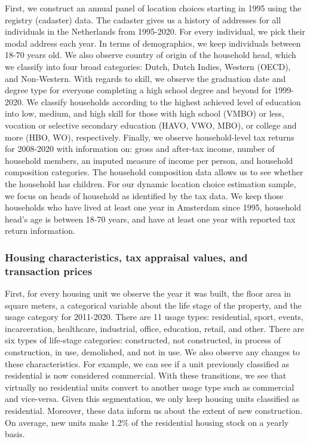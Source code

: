 \documentclass[11pt]{article}
\begin{document}
First, we construct an annual panel of location choices starting in 1995 using the registry (cadaster) data. The cadaster gives us a history of addresses for all individuals in the Netherlands from 1995-2020. For every individual, we pick their modal address each year. In terms of demographics, we keep individuals between 18-70 years old. We also observe country of origin of the household head, which we classify into four broad categories: Dutch, Dutch Indies, Western (OECD), and Non-Western. With regards to skill, we observe the graduation date and degree type for everyone completing a high school degree and beyond for 1999-2020. We classify households according to the highest achieved level of education into low, medium, and high skill for those with high school (VMBO) or less, vocation or selective secondary education (HAVO, VWO, MBO), or college and more (HBO, WO), respectively. Finally, we observe household-level tax returns for 2008-2020 with information on: gross and after-tax income, number of household members, an imputed measure of income per person, and household composition categories. The household composition data allows us to see whether the household has children. For our dynamic location choice estimation sample, we focus on heads of household as identified by the tax data. We keep those households who have lived at least one year in Amsterdam since 1995, household head's age is between 18-70 years, and have at least one year with reported tax return information. 


\subsubsection{Housing characteristics, tax appraisal values, and transaction prices}\label{sec: appendix housing characteristics}

First, for every housing unit we observe the year it was built, the floor area in square meters, a categorical variable about the life stage of the property, and the usage category for 2011-2020. There are 11 usage types: residential, sport, events, incarceration, healthcare, industrial, office, education, retail, and other. There are six types of life-stage categories: constructed, not constructed, in process of construction, in use, demolished, and not in use. We also observe any changes to these characteristics. For example, we can see if a unit previously classified as residential is now considered commercial. With these transitions, we see that virtually no residential units convert to another usage type such as commercial and vice-versa. Given this segmentation, we only keep housing units classified as residential. Moreover, these data inform us about the extent of new construction. On average, new units make 1.2\% of the residential housing stock on a yearly basis.
\end{document}
